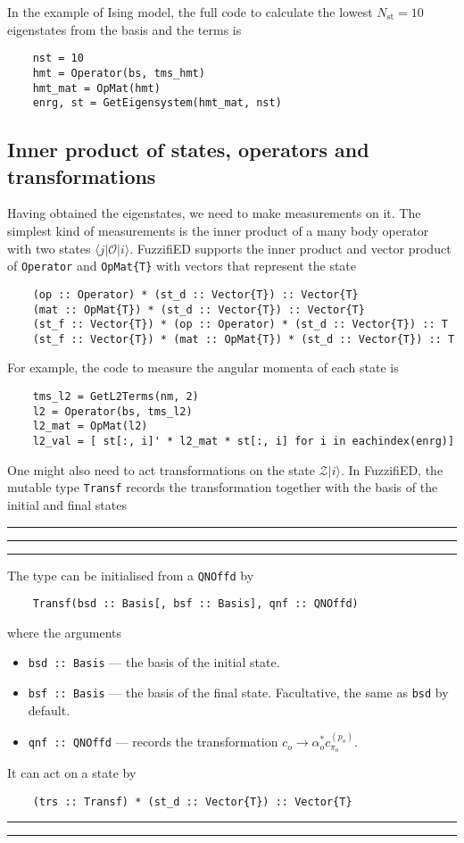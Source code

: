 \documentclass{timesjhep}
\newenvironment{block}[1]{\vspace{0.4\baselineskip}\hrule\vspace{0.10\baselineskip}\hrule\vspace{0.30\baselineskip}{\bfseries #1}\vspace{0.2\baselineskip}\hrule\vspace{0.3\baselineskip}
}{\vspace{0.2\baselineskip}\hrule\vspace{0.10\baselineskip}\hrule\vspace{0.5\baselineskip}}
\begin{document}
In the example of Ising model, the full code to calculate the lowest $N_\mathrm{st}=10$ eigenstates from the basis and the terms is 
\begin{lstlisting}
    nst = 10
    hmt = Operator(bs, tms_hmt)
    hmt_mat = OpMat(hmt)
    enrg, st = GetEigensystem(hmt_mat, nst)
\end{lstlisting}

\subsection{Inner product of states, operators and transformations}

Having obtained the eigenstates, we need to make measurements on it. The simplest kind of measurements is the inner product of a many body operator with two states $\langle j|\mathscr{O}|i\rangle$. FuzzifiED supports the inner product and vector product of \lstinline|Operator| and \lstinline|OpMat{T}| with vectors that represent the state
\begin{lstlisting}
    (op :: Operator) * (st_d :: Vector{T}) :: Vector{T}
    (mat :: OpMat{T}) * (st_d :: Vector{T}) :: Vector{T}
    (st_f :: Vector{T}) * (op :: Operator) * (st_d :: Vector{T}) :: T
    (st_f :: Vector{T}) * (mat :: OpMat{T}) * (st_d :: Vector{T}) :: T
\end{lstlisting}
For example, the code to measure the angular momenta of each state is
\begin{lstlisting}
    tms_l2 = GetL2Terms(nm, 2)
    l2 = Operator(bs, tms_l2)
    l2_mat = OpMat(l2)
    l2_val = [ st[:, i]' * l2_mat * st[:, i] for i in eachindex(enrg)]
\end{lstlisting}

One might also need to act transformations on the state $\mathscr{Z}|i\rangle$. In FuzzifiED, the mutable type \lstinline|Transf| records the transformation together with the basis of the initial and final states 

\begin{block}{\lstinline|Transf| --- Type}
The type can be initialised from a \lstinline|QNOffd| by 
\begin{lstlisting}
    Transf(bsd :: Basis[, bsf :: Basis], qnf :: QNOffd)
\end{lstlisting}
where the arguments 
\begin{itemize}
    \item \lstinline|bsd :: Basis| --- the basis of the initial state.
    \item \lstinline|bsf :: Basis| --- the basis of the final state. Facultative, the same as \lstinline|bsd| by default.
    \item \lstinline|qnf :: QNOffd| --- records the transformation $c_o\to \alpha_o^* c^{(p_o)}_{\pi_o}$.
\end{itemize}
It can act on a state by 
\begin{lstlisting}
    (trs :: Transf) * (st_d :: Vector{T}) :: Vector{T}
\end{lstlisting}
\end{block}
\end{document}
